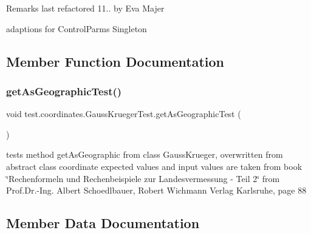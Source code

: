 \begin{DoxyRemark}{Remarks}
last refactored 11.. by Eva Majer ~\newline
 
\begin{DoxyItemize}
\item adaptions for Control\+Parms Singleton 
\end{DoxyItemize}
\end{DoxyRemark}


\subsection{Member Function Documentation}
\mbox{\label{classtest_1_1coordinates_1_1_gauss_krueger_test_a5fbfea508e96e4ad2be2aba1d27e85cc}} 
\subsubsection{\texorpdfstring{get\+As\+Geographic\+Test()}{getAsGeographicTest()}}
{\footnotesize\ttfamily void test.\+coordinates.\+Gauss\+Krueger\+Test.\+get\+As\+Geographic\+Test (\begin{DoxyParamCaption}{ }\end{DoxyParamCaption})}



tests method get\+As\+Geographic from class Gauss\+Krueger, overwritten from abstract class coordinate expected values and input values are taken from book \char`\"{}\+Rechenformeln und Rechenbeispiele zur Landesvermessung -\/ Teil 2\char`\"{} from Prof.\+Dr.-\/\+Ing. Albert Schoedlbauer, Robert Wichmann Verlag Karlsruhe, page 88 



\subsection{Member Data Documentation}
\mbox{\label{classtest_1_1coordinates_1_1_gauss_krueger_test_a226dbd7a3e821d48e9889c1753a8f52d}} 

